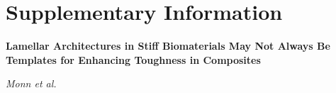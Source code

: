 \documentclass[12pt,onecolumn]{article}
\begin{document}




\makeatletter
\efloat@restorefloats
\makeatother

\doublespacing
\clearpage
\pagebreak
\onecolumn

\setcounter{page}{1}

\setcounter{section}{0}

\setcounter{equation}{0}

\setcounter{figure}{0}
\setcounter{table}{0}

\renewcommand{\refname}{\vskip -2em}

\renewcommand{\figurename}{Supplementary Figure}

\renewcommand{\tablename}{Supplementary Table}



\part*{Supplementary Information}

\textbf{Lamellar Architectures in Stiff Biomaterials May Not Always Be Templates for Enhancing Toughness in Composites}

\textit{Monn et al.}
\clearpage
\end{document}
